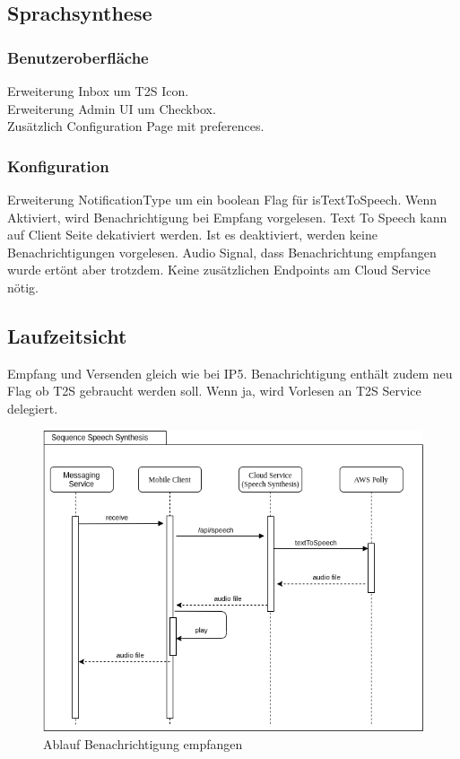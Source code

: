 
\subsection{Sprachsynthese}

\subsubsection*{Benutzeroberfläche}

Erweiterung Inbox um T2S Icon. \\
Erweiterung Admin UI um Checkbox. \\
Zusätzlich Configuration Page mit preferences. \\

\subsubsection*{Konfiguration}
Erweiterung NotificationType um ein boolean Flag für isTextToSpeech.
Wenn Aktiviert, wird Benachrichtigung bei Empfang vorgelesen.
Text To Speech kann auf Client Seite dekativiert werden.
Ist es deaktiviert, werden keine Benachrichtigungen vorgelesen.
Audio Signal, dass Benachrichtung empfangen wurde ertönt aber trotzdem.
Keine zusätzlichen Endpoints am Cloud Service nötig. \\


\subsection*{Laufzeitsicht}

Empfang und Versenden gleich wie bei IP5.
Benachrichtigung enthält zudem neu Flag ob T2S gebraucht werden soll.
Wenn ja, wird Vorlesen an T2S Service delegiert.

\begin{figure}[h]
    \centering
    \begin{minipage}[b]{0.9\textwidth}
        \includegraphics[width=\textwidth]{graphics/diagramms/Sequence_Speech_Synth_V01}
        \caption{Ablauf Benachrichtigung empfangen}
    \end{minipage}
\end{figure}

\clearpage
